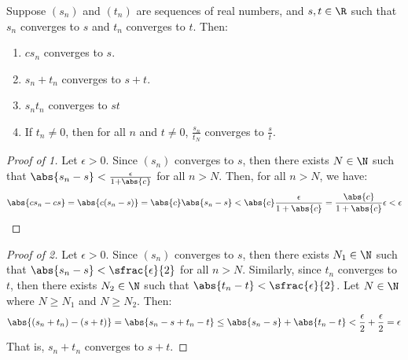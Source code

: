 \begin{thmbox}{}{}
    Suppose $(s_n)$ and $(t_n)$ are sequences of real numbers, and $s,t \in \R$ such that $s_n$ converges to $s$ and $t_n$ converges to $t$. Then:
    \begin{enumerate}
        \item $cs_n$ converges to $s$.
        \item $s_n + t_n$ converges to $s+t$.
        \item $s_nt_n$ converges to $st$
        \item If $t_n \neq 0$, then for all $n$ and $t \neq 0$, $\frac{s_n}{t_N}$ converges to $\frac{s}{t}$.
    \end{enumerate}
    \tcblower
    \begin{proof}[Proof of 1]
        Let $\epsilon > 0$. Since $(s_n)$ converges to $s$, then there exists $N \in \N$ such that $\abs{s_n - s} < \frac{\epsilon}{1 + \abs{c}}$ for all $n > N$. Then, for all $n > N$, we have:
        \[ \abs{cs_n - cs} = \abs{c(s_n-s)} = \abs{c}\abs{s_n-s} < \abs{c} \frac{\epsilon}{1+\abs{c}} = \frac{\abs{c}}{1+\abs{c}} \epsilon < \epsilon \]
    \end{proof}

    \begin{proof}[Proof of 2]
        Let $\epsilon > 0$. Since $(s_n)$ converges to $s$, then there exists $N_1 \in \N$ such that $\abs{s_n - s} < \sfrac{\epsilon}{2}$ for all $n > N$. Similarly, since $t_n$ converges to $t$, then there exists $N_2 \in \N$ such that $\abs{t_n - t} < \sfrac{\epsilon}{2}$. Let $N \in \N$ where $N \geq N_1$ and $N \geq N_2$. Then:
        \[ \abs{(s_n + t_n) - (s + t)} = \abs{s_n - s + t_n - t} \leq \abs{s_n - s} + \abs{t_n - t} < \frac{\epsilon}{2} + \frac{\epsilon}{2} = \epsilon \]
        That is, $s_n + t_n$ converges to $s + t$.
    \end{proof}


\end{thmbox}
